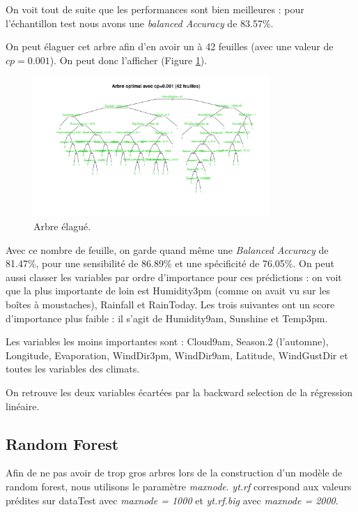 \documentclass{article}
\begin{document}
On voit tout de suite que les performances sont bien meilleures : pour l'échantillon test nous avons une \emph{balanced Accuracy} de 83.57\%. 

On peut élaguer cet arbre afin d'en avoir un à 42 feuilles (avec une valeur de $cp=0.001$). On peut donc l'afficher (Figure \ref{fig:topt}). 

\begin{figure}[H]
    \centering
    \includegraphics[width=0.8\textwidth]{Images/topt.png}
    \caption{Arbre élagué.}
    \label{fig:topt}
\end{figure}

Avec ce nombre de feuille, on garde quand même une \emph{Balanced Accuracy} de 81.47\%, pour une sensibilité de 86.89\% et une spécificité de 76.05\%. On peut aussi classer les variables par ordre d'importance pour ces prédictions : on voit que la plus importante de loin est Humidity3pm (comme on avait vu sur les boîtes à moustaches), Rainfall et RainToday. Les trois suivantes ont un score d'importance plus faible : il s'agit de Humidity9am, Sunshine et Temp3pm.

Les variables les moins importantes sont : Cloud9am, Season.2 (l'automne), Longitude, Evaporation, WindDir3pm, WindDir9am, Latitude, WindGustDir et toutes les variables des climats.

On retrouve les deux variables écartées par la backward selection de la régression linéaire. 

\subsection{Random Forest}

Afin de ne pas avoir de trop gros arbres lors de la construction d'un modèle de random forest, nous utilisons le paramètre \emph{maxnode}. \emph{yt.rf} correspond aux valeurs prédites sur dataTest avec \emph{maxnode = 1000} et \emph{yt.rf.big} avec \emph{maxnode = 2000}. 
\end{document}
